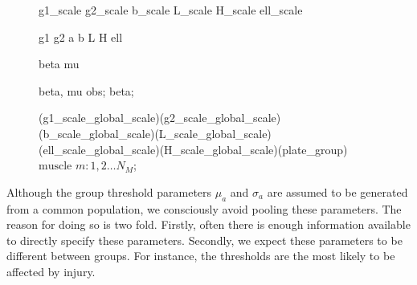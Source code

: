 \documentclass[a4paper,12pt]{article}
\begin{document}
\begin{figure}[H]
{        %
         {g1_scale}
         {g2_scale}
         {b_scale}
         {L_scale}
         {H_scale}
         {ell_scale}

         {g1}
         {g2}
         {a}
         {b}
         {L}
         {H}
         {ell}

         {beta}
         {mu}

         {beta, mu}
         {obs};
         {beta};

         {(g1_scale_global_scale)(g2_scale_global_scale)(b_scale_global_scale)(L_scale_global_scale)(ell_scale_global_scale)(H_scale_global_scale)(plate_group)} {$\text{muscle } m: 1, 2 \ldots N_M$};
    }
\end{figure}

Although the group threshold parameters $\mu_a$ and $\sigma_a$ are assumed to be generated from a common population, we consciously avoid pooling these parameters. The reason for doing so is two fold. Firstly, often there is enough information available to directly specify these parameters. Secondly, we expect these parameters to be different between groups. For instance, the thresholds are the most likely to be affected by injury.
\end{document}
